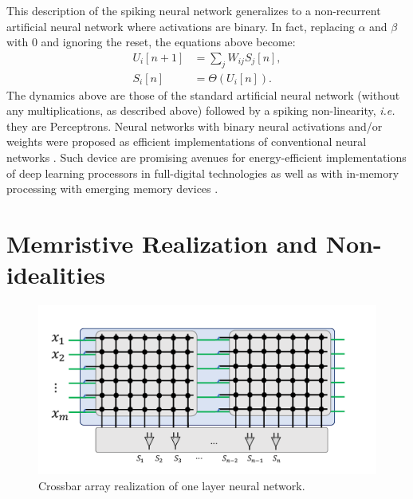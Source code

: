 \documentclass[english]{article}
\renewcommand{\cite}{\citep}
\begin{document}
This description of the spiking neural network generalizes to a non-recurrent artificial neural network where activations are binary. In fact, replacing $\alpha$ and $\beta$ with 0 and ignoring the reset, the equations above become:
%
\begin{equation}
  \begin{split}\label{eq:perceptron}
    U_i[n+1] & = \sum_j W_{ij} S_j[n],\\
    S_i[n] &= \Theta(U_i[n]).
  \end{split}
\end{equation}
%
The dynamics above are those of the standard artificial neural network (without any multiplications, as described above) followed by a spiking non-linearity, \emph{i.e.} they are Perceptrons.
Neural networks with binary neural activations and/or weights were proposed as efficient implementations of conventional neural networks \cite{Courbariaux_etal16_binaneur,Rastegari_etal16_xnorimag}. Such device are promising avenues for energy-efficient implementations of deep learning processors in full-digital technologies \cite{Andri_etal16_yodaultr,Umuroglu_etal17_finnfram} as well as with in-memory processing with emerging memory devices \cite{Sun_etal18_fullpara}.



\section{ Memristive Realization and Non-idealities}

\begin{figure}[!h]
\centering
\includegraphics[width=0.8\linewidth]{SingleLayer.pdf}%

\caption{\label{fig:crossbar_array} Crossbar array realization of one layer neural network.}
\end{figure}
\end{document}
